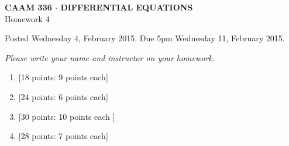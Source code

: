 \documentclass[10pt]{article}
\begin{document}
\newcommand{\pd}[3]{\frac{\partial^{#3} #1}{\partial #2^{#3}}}

\vspace*{-5em}
\begin{center}
\large \textsf{\textbf{CAAM 336 $\cdot$ DIFFERENTIAL EQUATIONS}\\[0.5em]
Homework 4 }
\end{center}

Posted Wednesday 4, February 2015.  Due 5pm Wednesday 11, February 2015.

\begin{center}
\emph{Please write your name and instructor on your homework.}
\end{center}

\begin{enumerate}
\item {[18 points: 9 points each]}\\  
\vspace{1cm}
\item {[24 points: 6 points each]}\\  
\newpage
\item {[30 points: 10 points each ]}\\  
\newpage
\item {[28 points: 7 points each]}\\   


\end{enumerate}
\end{document}
